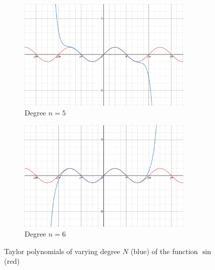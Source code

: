 \documentclass[a4paper,11pt]{article}
\theoremstyle{plain}
\begin{document}
\begin{figure}[hbtp]
	\begin{subfigure}{0.5\textwidth}
		\centering
		\includegraphics[width=0.9\textwidth]{taylor5}
		\caption{Degree $n=5$}
	\end{subfigure}
	\begin{subfigure}{0.5\textwidth}
		\centering
		\includegraphics[width=0.9\textwidth]{taylor6}
		\caption{Degree $n=6$}
	\end{subfigure}

	\caption{Taylor polynomials of varying degree $N$ (blue) of the function $\sin$ (red)}
	\label{fig:taylor-polynomials-of-sin}
\end{figure}


\end{document}
